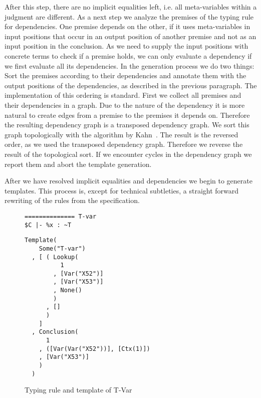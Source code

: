 
After this step, there are no implicit equalities left, i.e. all
meta-variables within a judgment are different. As a next step we
analyze the premises of the typing rule for dependencies. One premise
depends on the other, if it uses meta-variables in input positions
that occur in an output position of another premise and not as an
input position in the conclusion. As we need to supply the input
positions with concrete terms to check if a premise holds, we can only
evaluate a dependency if we first evaluate all its dependencies. In
the generation process we do two things: Sort the premises according
to their dependencies and annotate them with the output positions of
the dependencies, as described in the previous paragraph. The
implementation of this ordering is standard. First we collect all
premises and their dependencies in a graph. Due to the nature of the
dependency it is more natural to create edges from a premise to the
premises it depends on. Therefore the resulting dependency graph is a
transposed dependency graph. We sort this graph topologically with the
algorithm by Kahn~\cite{Kahn:1962:TSL:368996.369025}. The result is
the reversed order, as we used the transposed dependency
graph. Therefore we reverse the result of the topological sort. If we
encounter cycles in the dependency graph we report them and abort the
template generation.

After we have resolved implicit equalities and dependencies we begin
to generate templates. This process is, except for technical
subtleties, a straight forward rewriting of the rules from the
specification. 

\begin{figure}
  \centering
  \begin{minipage}{.35\linewidth}
\begin{lstlisting}[language=sltc]
%x : ~T in $C
============== T-var
$C |- %x : ~T
\end{lstlisting}
  \end{minipage}
  \begin{minipage}{.55\linewidth}
\begin{lstlisting}[language=sltc]
Template(
    Some("T-var")
  , [ ( Lookup(
          1
        , [Var("X52")]
        , [Var("X53")]
        , None()
        )
      , []
      )
    ]
  , Conclusion(
      1
    , ([Var(Var("X52"))], [Ctx(1)])
    , [Var("X53")]
    )
  )
\end{lstlisting}
  \end{minipage}
  \caption{Typing rule and template of T-Var}
  \label{fig:template-example}
\end{figure}
